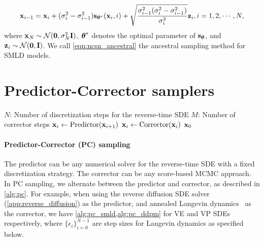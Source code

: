 \begin{align}
    \mathbf{x}_{i-1} = \mathbf{x}_i + (\sigma_i^2 - \sigma_{i-1}^2) \mathbf{s}_{{\boldsymbol{\theta}}^*}(\mathbf{x}_i, i) + \sqrt{\frac{\sigma_{i-1}^2 (\sigma_i^2 - \sigma_{i-1}^2)}{\sigma_i^2}} \mathbf{z}_i, i=1,2,\cdots, N, \label{eqn:ncsn_ancestral}
\end{align}
where $\mathbf{x}_N \sim \mathcal{N}(\mathbf{0}, \sigma_N^2 \mathbf{I})$, ${\boldsymbol{\theta}}^*$ denotes the optimal parameter of $\mathbf{s}_{\boldsymbol{\theta}}$, and $\mathbf{z}_i \sim \mathcal{N}(\mathbf{0}, \mathbf{I})$. We call \cref{eqn:ncsn_ancestral} the ancestral sampling method for SMLD models.


\section{Predictor-Corrector samplers}\label{app:pc}

\begin{algorithm}[!t]
   \caption{Predictor-Corrector (PC) sampling}
   \label{alg:pc}
    \begin{algorithmic}[1]
        \Require    
            \Statex $N$: Number of discretization steps for the reverse-time SDE
            \Statex $M$: Number of corrector steps
        \State $\mathbf{x}_i \gets \operatorname{Predictor}(\mathbf{x}_{i+1})$
            \State $\mathbf{x}_i \gets \operatorname{Corrector}(\mathbf{x}_i)$
         \EndFor
       \EndFor
        $\mathbf{x}_0$
    \end{algorithmic}
    \end{algorithm}

\paragraph{Predictor-Corrector (PC) sampling} 
The predictor can be any numerical solver for the reverse-time SDE with a fixed discretization strategy. The corrector can be any score-based MCMC approach. In PC sampling, we alternate between the predictor and corrector, as described in \cref{alg:pc}. For example, when using the reverse diffusion SDE solver (\cref{app:reverse_diffusion}) as the predictor, and annealed Langevin dynamics~\citep{song2019generative} as the corrector, we have \cref{alg:pc_smld,alg:pc_ddpm} for VE and VP SDEs respectively, where $\{\epsilon_i\}_{i=0}^{N-1}$ are step sizes for Langevin dynamics as specified below.

